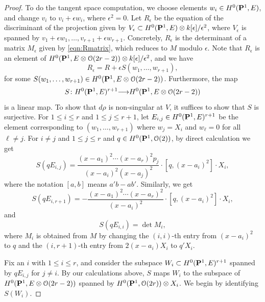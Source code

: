\documentclass[11pt,reqno]{amsart}
\theoremstyle{plain}
\theoremstyle{definition}
\theoremstyle{remark}
\numberwithin{equation}{section}
\renewcommand{\k}{k}
\renewcommand{\to}{{\longrightarrow}}
\numberwithin{equation}{section}
\renewcommand{\O}{\mathcal O}
\begin{document}
\begin{proof}
  To do the tangent space computation, we choose elements $w_i \in H^0(\P^1, E)$, and change $v_i$ to $v_i + \epsilon w_i$, where $\epsilon^2 = 0$.
  Let $R_\epsilon$ be the equation of the discriminant of the projection given by $V_\epsilon \subset H^0(\P^1, E) \otimes \k[\epsilon]/\epsilon^2$, where $V_\epsilon$ is spanned by $v_1 + \epsilon w_1, \dots, v_{r+1} + \epsilon w_{r+1}$.
  Concretely, $R_\epsilon$ is the determinant of a matrix $M_\epsilon$ given by \eqref{eqn:Rmatrix}, which reduces to $M$ modulo $\epsilon$.
  Note that $R_\epsilon$ is an element of $H^0(\P^1, E \otimes \O(2r-2)) \otimes \k[\epsilon]/\epsilon^2$, and we have
  \[ R_\epsilon =  R + \epsilon S(w_1, \dots, w_{r+1}),\]
  for some $S(w_1, \dots, w_{r+1}) \in H^0(\P^1, E \otimes \O(2r-2))$.
  Furthermore, the map
  \begin{equation}\label{eqn:mainmap}
    S \from H^0(\P^1, E)^{r+1} \to H^0(\P^1, E \otimes \O(2r-2))
  \end{equation}
  is a linear map.
  To show that $d \rho$ is non-singular at $V$, it suffices to show that $S$ is surjective.
  For $1 \leq i \leq r$ and $1 \leq j \leq r+1$, let $E_{i,j} \in H^0(\P^1, E)^{r+1}$ be the element corresponding to $(w_1, \dots, w_{r+1})$ where $w_j = X_i$ and $w_\ell = 0$ for all $\ell \neq j$.
  For $i \neq j$ and $1 \leq j \leq r$ and $q \in H^0(\P^1, \O(2))$, by direct calculation we get
  \[ S\left(qE_{i,j}\right) = \frac{(x-a_1)^2 \cdots (x-a_r)^2p_j}{(x-a_i)^2(x-a_j)^2} \cdot [q, (x-a_i)^2] \cdot X_i,\]
  where the notation $[a,b]$ means $a'b-ab'$.
  Similarly, we get
  \[ S\left(qE_{i,r+1}\right) = - \frac{(x-a_1)^2 \cdots (x-a_r)^2}{(x-a_i)^2} \cdot [q, (x-a_i)^2] \cdot X_i,\]
  and
  \begin{equation}\label{eqn:diag}
    S\left(qE_{i,i} \right) = \det M_i,
  \end{equation}
  where $M_i$ is obtained from $M$ by changing the $(i,i)$-th entry from $(x-a_i)^2$ to $q$ and the $(i,r+1)$-th entry from $2(x-a_i)X_i$ to $q'X_i$.

  Fix an $i$ with $1 \leq i \leq r$, and consider the subspace $W_i \subset H^0(\P^1, E)^{r+1}$ spanned by $q E_{i,j}$ for $j \neq i$.
  By our calculations above, $S$ maps $W_i$ to the subspace of $H^0(\P^1, E \otimes \O(2r-2))$ spanned by $H^0(\P^1, \O(2r)) \otimes X_i$.
  We begin by identifying $S(W_i)$.


\end{proof}
\end{document}
